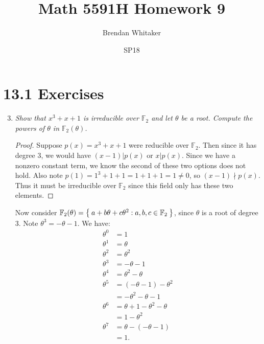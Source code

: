 \documentclass[10pt,oneside,reqno]{amsart}
\theoremstyle{plain}
\theoremstyle{definition}
\theoremstyle{remark}
\theoremstyle{plain}
\newcommand{\F}{\mathbb{F}}
\newcommand{\bee}{\begin{equation}\begin{aligned}}
\newcommand{\eee}{\end{aligned}\end{equation}}
\begin{document}
\title{Math 5591H Homework 9}

\date{SP18}

\author[Brendan Whitaker]{Brendan Whitaker}

\maketitle



\section*{13.1 Exercises}

\begin{enumerate}[label=\arabic*.]

\setcounter{enumi}{2}

\item \textit{Show that $x^3 + x + 1$ is irreducible over $\mathbb{F}_2$ and let $\theta$ be a root. Compute the powers of $\theta$ in $\mathbb{F}_2(\theta)$. } 

\begin{proof}
Suppose $p(x) = x^3 + x + 1$ were reducible over $\F_2$. Then since it has degree $3$, we would have $(x - 1)|p(x)$ or $x|p(x)$. Since we have a nonzero constant term, we know the second of these two options does not hold. Also note $p(1) = 1^3 + 1 + 1 = 1 + 1 + 1 = 1 \neq 0$, so $(x - 1) \nmid p(x)$. Thus it must be irreducible over $\F_2$ since this field only has these two elements. 
\end{proof}

Now consider $\F_2(\theta) = \Set{a + b\theta + c\theta^2: a,b,c \in \F_2}$, since $\theta$ is a root of degree 3. Note $\theta^3 = -\theta - 1$. We have:
\bee
\theta^0 &= 1\\
\theta^1 &= \theta\\
\theta^2 &= \theta^2\\
\theta^3 &= -\theta - 1\\
\theta^4 &= \theta^2 - \theta\\
\theta^5 &= (-\theta - 1) - \theta^2\\
&= -\theta^2 - \theta - 1\\
\theta^6 &= \theta + 1 - \theta^2 - \theta\\
&= 1 - \theta^2\\
\theta^7 &= \theta - (-\theta - 1)\\
&= 1.
\eee
\end{enumerate}
\end{document}
